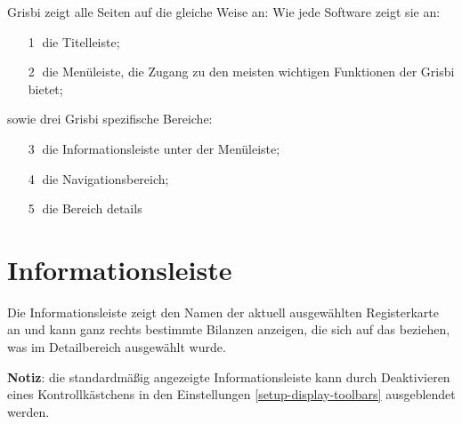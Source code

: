 
Grisbi zeigt alle Seiten auf die gleiche Weise an: Wie jede Software zeigt sie an:%

\begin{itemize}%
	\item[\large\textcircled{\small 1}] die Titelleiste;%
	\item[\large\textcircled{\small 2}] die Menüleiste, die Zugang zu den meisten wichtigen Funktionen der Grisbi bietet;%
\end{itemize}
sowie drei Grisbi spezifische Bereiche:%
\begin{itemize}%
	\item[\large\textcircled{\small 3}] die Informationsleiste unter der Menüleiste;%
	\item[\large\textcircled{\small 4}] die Navigationsbereich;%
	\item[\large\textcircled{\small 5}] die Bereich details%
\end{itemize}


\section{Informationsleiste\label{home-synthesis}}

Die Informationsleiste zeigt den Namen der aktuell ausgewählten Registerkarte an und kann ganz rechts bestimmte Bilanzen anzeigen, die sich auf das beziehen, was im Detailbereich ausgewählt wurde.%

\textbf{Notiz}: die standardmäßig angezeigte Informationsleiste kann durch Deaktivieren eines Kontrollkästchens in den Einstellungen \vref{setup-display-toolbars} ausgeblendet werden.%

